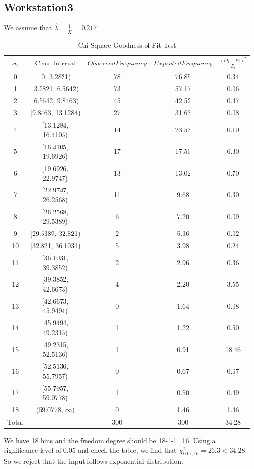 \documentclass{article}
\begin{document}
\subsection{Workstation3}

We assume that $\hat{\lambda}=\frac{1}{\bar{X}}=0.217$
\begin{table}[htp]
\caption{Chi-Square Goodness-of-Fit Test}
\begin{center}
\begin{tabular}{ccccc}
\hline
$x_i$ & Class Interval & $Observed Frequency$ & $Expected Frequency$ & $\frac{(O_i-E_i)^2}{E_i}$\\
0&[0, 3.2821)&78&76.85&0.34\\
1&[3.2821, 6.5642)&73&57.17&0.06\\
2&[6.5642, 9.8463)&45&42.52&0.47\\
3&[9.8463, 13.1284)&27&31.63&0.08\\
4&[13.1284, 16.4105)&14&23.53&0.10\\
5&[16.4105, 19.6926)&17&17.50&6.30\\
6&[19.6926, 22.9747)&13&13.02&0.70\\
7&[22.9747, 26.2568)&11&9.68&0.30\\
8&[26.2568, 29.5389)&6&7.20&0.09\\
9&[29.5389, 32.821)&2&5.36&0.02\\
10&[32.821, 36.1031)&5&3.98&0.24\\
11&[36.1031, 39.3852)&2&2.96&0.36\\
12&[39.3852, 42.6673)&4&2.20&3.55\\
13&[42.6673, 45.9494)&0&1.64&0.08\\
14&[45.9494, 49.2315)&1&1.22&0.50\\
15&[49.2315, 52.5136)&1&0.91&18.46\\
16&[52.5136, 55.7957)&0&0.67&0.67\\
17&[55.7957, 59.0778)&1&0.50&0.49\\
18&(59.0778, $\infty$)&0&1.46&1.46\\
\hline
Total& &300&300&34.28\\

\hline

\end{tabular}
\end{center}
\label{default}
\end{table}%

We have 18 bins and the freedom degree should be 18-1-1=16. Using a significance level of 0.05 and check the table, we find that $\chi^2_{0.05, 16}=26.3 < 34.28$. So we reject that the input follows exponential distribution.
\end{document}
